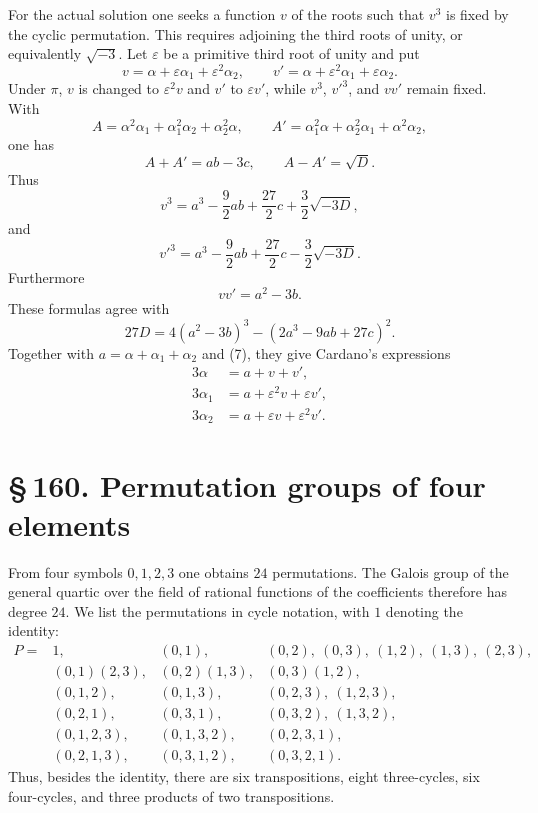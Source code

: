 \documentclass[11pt]{article}
\providecommand{\sect}[2]{\section*{\S\,#1. #2}}
\begin{document}
For the actual solution one seeks a function $v$ of the roots such that $v^3$ is fixed by the cyclic permutation. This requires adjoining the third roots of unity, or equivalently $\sqrt{-3}$. Let $\varepsilon$ be a primitive third root of unity and put
\[
        v=\alpha+\varepsilon\alpha_1+\varepsilon^2\alpha_2,
        \qquad
        v'=\alpha+\varepsilon^2\alpha_1+\varepsilon\alpha_2.
\tag{7}
\]
Under $\pi$, $v$ is changed to $\varepsilon^2v$ and $v'$ to $\varepsilon v'$, while $v^3$, $v'^3$, and $vv'$ remain fixed. With
\[
        A=\alpha^2\alpha_1+
\alpha_1^2\alpha_2+
\alpha_2^2\alpha,
        \qquad
        A'=\alpha_1^2\alpha+
\alpha_2^2\alpha_1+
\alpha^2\alpha_2,
\]
one has
\[
        A+A'=ab-3c,
\qquad
        A-A'=\sqrt D.
\]
Thus
\[
        v^3=a^3-\frac{9}{2}ab+\frac{27}{2}c+\frac{3}{2}\sqrt{-3D},
\tag{8}
\]
and
\[
        v'^3=a^3-\frac{9}{2}ab+\frac{27}{2}c-\frac{3}{2}\sqrt{-3D}.
\tag{9}
\]
Furthermore
\[
        vv'=a^2-3b.
\tag{10}
\]
These formulas agree with
\[
        27D=4(a^2-3b)^3-(2a^3-9ab+27c)^2.
\]
Together with $a=\alpha+
\alpha_1+
\alpha_2$ and (7), they give Cardano's expressions
\[
\begin{aligned}
        3\alpha&=a+v+v',\\
        3\alpha_1&=a+\varepsilon^2v+\varepsilon v',\\
        3\alpha_2&=a+\varepsilon v+\varepsilon^2v'.
\end{aligned}
\]

\sect{160}{Permutation groups of four elements}

From four symbols $0,1,2,3$ one obtains $24$ permutations. The Galois group of the general quartic over the field of rational functions of the coefficients therefore has degree $24$. We list the permutations in cycle notation, with $1$ denoting the identity:
\[
\begin{array}{llll}
P=&1,&(0,1),&(0,2),\ (0,3),\ (1,2),\ (1,3),\ (2,3),\\
  &(0,1)(2,3),&(0,2)(1,3),&(0,3)(1,2),\\
  &(0,1,2),&(0,1,3),&(0,2,3),\ (1,2,3),\\
  &(0,2,1),&(0,3,1),&(0,3,2),\ (1,3,2),\\
  &(0,1,2,3),&(0,1,3,2),&(0,2,3,1),\\
  &(0,2,1,3),&(0,3,1,2),&(0,3,2,1).
\end{array}
\tag{1}
\]
Thus, besides the identity, there are six transpositions, eight three-cycles, six four-cycles, and three products of two transpositions.
\end{document}
